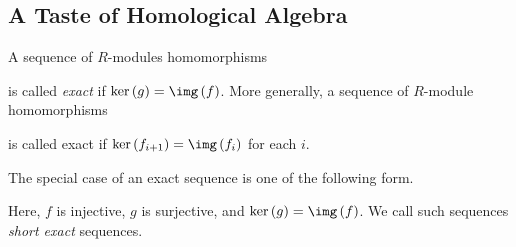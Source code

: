 \documentclass[10pt]{mypackage}
\begin{document}
\subsection{A Taste of Homological Algebra}%
\begin{definition}
  A sequence of $R$-modules homomorphisms 
  \begin{center}
  \end{center}
  is called \textit{exact} if $\ker\left( g \right) = \img\left( f \right)$. More generally, a sequence of $R$-module homomorphisms
  \begin{center}
  \end{center}
  is called exact if $\ker\left( f_{i+1} \right) = \img\left( f_i \right)$ for each $i$.
\end{definition}
\begin{definition}
  The special case of an exact sequence is one of the following form.
  \begin{center}
  \end{center}
  Here, $f$ is injective, $g$ is surjective, and $\ker\left( g \right) = \img\left( f \right)$. We call such sequences \textit{short exact} sequences.
\end{definition}
\end{document}
